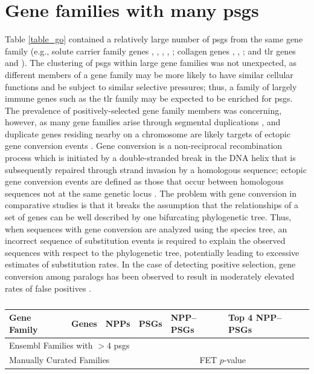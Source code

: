 \section{Gene families with many \acp{psg}}

Table \ref{table_go} contained a relatively large number of \acp{psg}
from the same gene family (e.g., solute carrier family genes
, , , ,
; collagen genes , ,
; and \ac{tlr} genes  and
). The clustering of \acp{psg} within large gene families
was not unexpected, as different members of a gene family may be more
likely to have similar cellular functions and be subject to similar
selective pressures; thus, a family of largely immune genes such as
the \ac{tlr} family may be expected to be enriched for \acp{psg}. The
prevalence of positively-selected gene family members was concerning,
however, as many gene families arise through segmental duplications
\citep{Ohno1970}, and duplicate genes residing nearby on a chromosome
are likely targets of ectopic gene conversion events
\citep{Ezawa2006,Benovoy2009}. Gene conversion is a non-reciprocal
recombination process which is initiated by a double-stranded break in
the DNA helix that is subsequently repaired through strand invasion by
a homologous sequence; ectopic gene conversion events are defined as
those that occur between homologous sequences not at the same genetic
locus \citep{Benovoy2009}. The problem with gene conversion in
comparative studies is that it breaks the assumption that the
relationships of a set of genes can be well described by one
bifurcating phylogenetic tree. Thus, when sequences with gene
conversion are analyzed using the species tree, an incorrect sequence
of substitution events is required to explain the observed sequences
with respect to the phylogenetic tree, potentially leading to
excessive estimates of substitution rates. In the case of detecting
positive selection, gene conversion among paralogs has been observed
to result in moderately elevated rates of false positives
\citep{Casola2009}.

\begin{table}
\centering \footnotesize
\begin{tabular}{lrrrrrl}

\toprule

Gene Family & Genes & NPPs & PSGs &
\multicolumn{2}{l}{NPP--PSGs} & Top 4 NPP--PSGs \\

\midrule
\multicolumn{4}{l}{Ensembl Families with $>4$ \acp{psg}} & & & \\
\midrule



\midrule
\multicolumn{4}{l}{Manually Curated Families} & & \multicolumn{2}{l}{FET $p$-value} \\
\midrule



\bottomrule
\end{tabular}
\caption{}
\label{table_psg_fams}
\end{table}

